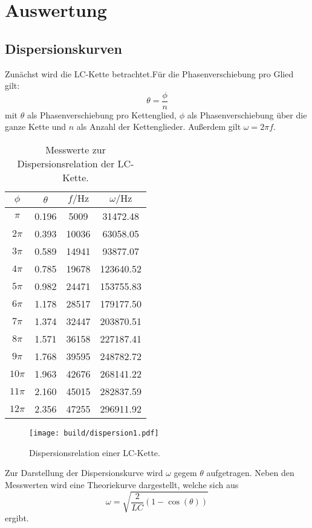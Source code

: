 \section{Auswertung}
\label{sec:Auswertung}
\subsection{Dispersionskurven}
Zunächst wird die LC-Kette betrachtet.Für die Phasenverschiebung pro Glied gilt:
\begin{equation}
  \theta = \frac{\phi}{n}
\end{equation}
mit $\theta$ als Phasenverschiebung pro Kettenglied, $\phi$ als Phasenverschiebung über die ganze Kette und $n$ als Anzahl der Kettenglieder.
Außerdem gilt $\omega = 2\pi f$.

\begin{table}
  \centering
  \caption{Messwerte zur Dispersionsrelation der LC-Kette.}
  \label{tab:dispersion1}
  \begin{tabular}{c c c c}
    \toprule
    $\phi$ & $\theta$ & $f / \si{\hertz}$ & $\omega / \si{\hertz}$ \\
    \midrule
$\pi$ & 0.196 & 5009 & 31472.48 \\
$2\pi$ & 0.393 & 10036 & 63058.05 \\
$3\pi$ & 0.589 & 14941 & 93877.07 \\
$4\pi$ & 0.785 & 19678 & 123640.52 \\
$5\pi$ & 0.982 & 24471 & 153755.83 \\
$6\pi$ & 1.178 & 28517 & 179177.50 \\
$7\pi$ & 1.374 & 32447 & 203870.51 \\
$8\pi$ & 1.571 & 36158 & 227187.41 \\
$9\pi$ & 1.768 & 39595 & 248782.72 \\
$10\pi$ & 1.963 & 42676 & 268141.22 \\
$11\pi$ & 2.160 & 45015 & 282837.59 \\
$12\pi$ & 2.356 & 47255 & 296911.92 \\
\bottomrule
\end{tabular}
\end{table}

\begin{figure}
  \centering
  \texttt{[image: build/dispersion1.pdf]}
\caption{Dispersionsrelation einer LC-Kette.}
  \label{fig:dispersion-lc}
\end{figure}

Zur Darstellung der Dispersionskurve wird $\omega$ gegem $\theta$ aufgetragen. Neben den Messwerten wird eine Theoriekurve dargestellt, welche sich aus
\begin{equation}
  \omega = \sqrt{\frac{2}{LC}(1-\cos(\theta))}
\end{equation}
ergibt.


